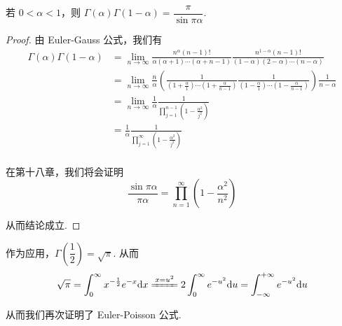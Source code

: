 
\begin{property}
    若 $0<\alpha<1$，则 $\Gamma(\alpha)\Gamma(1-\alpha)=\dfrac{\pi}{\sin\pi\alpha}$.
\end{property}
\begin{proof}
    由 Euler-Gauss 公式，我们有
$$
\begin{aligned}
    \Gamma(\alpha)\Gamma(1-\alpha)&=\lim_{n\to\infty}\frac{n^\alpha(n-1)!}{\alpha(\alpha+1)\cdots(\alpha+n-1)}\frac{n^{1-\alpha}(n-1)!}{(1-\alpha)(2-\alpha)\cdots(n-\alpha)}\\
    &=\lim_{n\to\infty}\frac{n}{\alpha}\left(\frac{1}{\displaystyle\left(1+\frac{\alpha}{1}\right)\cdots\left(1+\frac{\alpha}{n-1}\right)}\frac{1}{\displaystyle\left(1-\frac{\alpha}{1}\right)\cdots\left(1-\frac{\alpha}{n-1}\right)}\right)\frac{1}{n-\alpha}\\
    &=\lim_{n\to\infty}\frac{1}{\alpha}\frac{1}{\displaystyle\prod_{j=1}^{n-1}\left(1-\frac{\alpha^2}{j^2}\right)}\\
    &=\frac{1}{\alpha}\frac{1}{\displaystyle\prod_{j=1}^\infty\left(1-\frac{\alpha^2}{j^2}\right)}\\
\end{aligned}
$$

    在第十八章，我们将会证明
$$
\frac{\sin\pi\alpha}{\pi\alpha}=\prod_{n=1}^\infty\left(1-\frac{\alpha^2}{n^2}\right)
$$

    从而结论成立.
\end{proof}

作为应用，$\Gamma\left(\dfrac{1}{2}\right)=\sqrt{\pi}$. 从而
$$
\sqrt{\pi}=\int_0^\infty x^{-\frac{1}{2}}e^{-x}\dd x\xlongequal{x=u^2}2\int_0^\infty e^{-u^2}\dd u=\int_{-\infty}^{+\infty}e^{-u^2}\dd u
$$

从而我们再次证明了 Euler-Poisson 公式.



